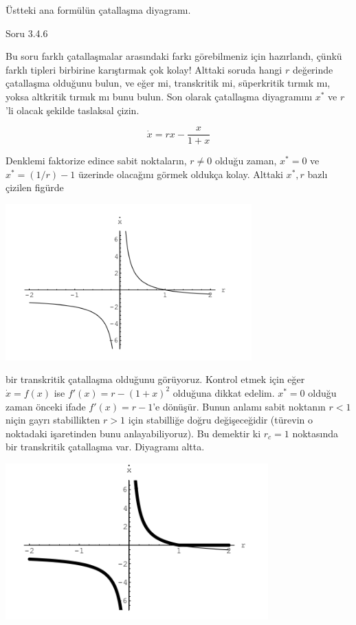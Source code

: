 \documentclass[12pt,fleqn]{article}\usepackage{../../common}
\begin{document}
Üstteki ana formülün çatallaşma diyagramı.

Soru 3.4.6

Bu soru farklı çatallaşmalar arasındaki farkı görebilmeniz için hazırlandı,
çünkü farklı tipleri birbirine karıştırmak çok kolay! Alttaki soruda hangi $r$
değerinde çatallaşma olduğunu bulun, ve eğer mi, transkritik mi, süperkritik
tırmık mı, yoksa altkritik tırmık mı bunu bulun. Son olarak çatallaşma
diyagramını $x^*$ ve $r$'li olacak şekilde taslaksal çizin.

$$ \dot{x} = rx - \frac{x}{1+x} $$

Denklemi faktorize edince sabit noktaların, $r \ne 0$ olduğu zaman, $x^*=0$ ve
$x^*=(1/r)-1$ üzerinde olacağını görmek oldukça kolay. Alttaki $x^*,r$ bazlı
çizilen figürde

\includegraphics[height=6cm]{08_04.png}

bir transkritik çatallaşma olduğunu görüyoruz. Kontrol etmek için eğer
$\dot{x}=f(x)$ ise $f'(x) = r - (1+x)^2$ olduğuna dikkat edelim. $x^*=0$ olduğu
zaman önceki ifade $f'(x) = r-1$'e dönüşür. Bunun anlamı sabit noktanın $r<1$
niçin gayrı stabillikten $r>1$ için stabilliğe doğru değişeceğidir (türevin o
noktadaki işaretinden bunu anlayabiliyoruz). Bu demektir ki $r_c = 1$ noktasında
bir transkritik çatallaşma var. Diyagramı altta.

\includegraphics[height=6cm]{08_05.png}
\end{document}
